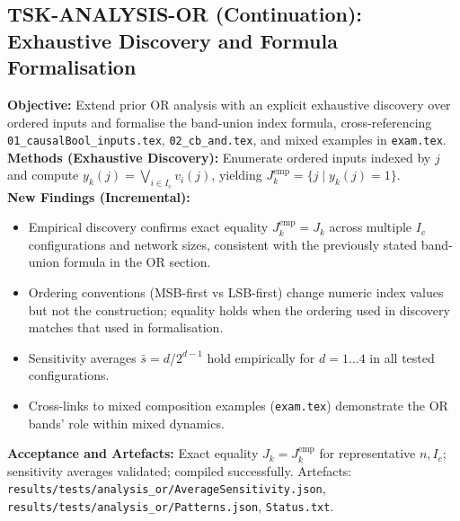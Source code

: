 \documentclass[11pt]{article}
\begin{document}
\subsection{TSK-ANALYSIS-OR (Continuation): Exhaustive Discovery and Formula Formalisation}
\textbf{Objective:} Extend prior OR analysis with an explicit exhaustive discovery over ordered inputs and formalise the band-union index formula, cross-referencing \texttt{01\_causalBool\_inputs.tex}, \texttt{02\_cb\_and.tex}, and mixed examples in \texttt{exam.tex}.\\
\textbf{Methods (Exhaustive Discovery):} Enumerate ordered inputs indexed by \(j\) and compute \(y_k(j)=\bigvee_{i\in I_c} v_i(j)\), yielding \(J_k^{\mathrm{emp}}=\{j\mid y_k(j)=1\}\).\\
\textbf{New Findings (Incremental):}
\begin{itemize}
 \item Empirical discovery confirms exact equality \(J_k^{\mathrm{emp}}=J_k\) across multiple \(I_c\) configurations and network sizes, consistent with the previously stated band-union formula in the OR section.
 \item Ordering conventions (MSB-first vs LSB-first) change numeric index values but not the construction; equality holds when the ordering used in discovery matches that used in formalisation.
 \item Sensitivity averages \(\bar{s}=d/2^{d-1}\) hold empirically for \(d=1\dots 4\) in all tested configurations.
 \item Cross-links to mixed composition examples (\texttt{exam.tex}) demonstrate the OR bands’ role within mixed dynamics.
\end{itemize}
\textbf{Acceptance and Artefacts:} Exact equality \(J_k=J_k^{\mathrm{emp}}\) for representative \(n,I_c\); sensitivity averages validated; compiled successfully. Artefacts: \texttt{results/tests/analysis\_or/AverageSensitivity.json}, \texttt{results/tests/analysis\_or/Patterns.json}, \texttt{Status.txt}.
\end{document}
